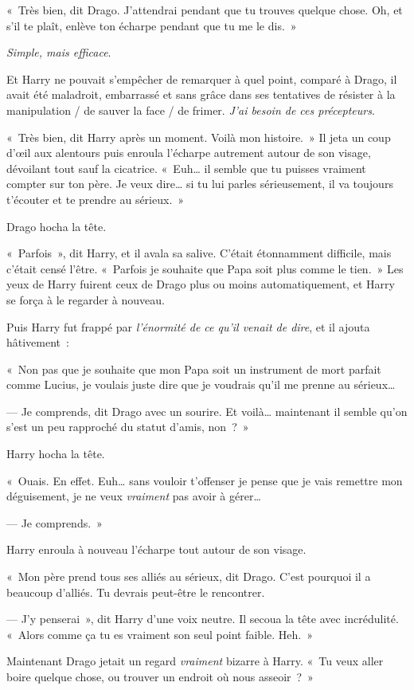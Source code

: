 «~Très bien, dit Drago. J'attendrai pendant que tu trouves quelque chose. Oh, et s'il te plaît, enlève ton écharpe pendant que tu me le dis.~»

\emph{Simple, mais efficace}.

Et Harry ne pouvait s'empêcher de remarquer à quel point, comparé à Drago, il avait été maladroit, embarrassé et sans grâce dans ses tentatives de résister à la manipulation / de sauver la face / de frimer. \emph{J'ai besoin de ces précepteurs}.

«~Très bien, dit Harry après un moment. Voilà mon histoire.~» Il jeta un coup d'œil aux alentours puis enroula l'écharpe autrement autour de son visage, dévoilant tout sauf la cicatrice. «~Euh… il semble que tu puisses vraiment compter sur ton père. Je veux dire… si tu lui parles sérieusement, il va toujours t'écouter et te prendre au sérieux.~»

Drago hocha la tête.

«~Parfois~», dit Harry, et il avala sa salive. C'était étonnamment difficile, mais c'était censé l'être. «~Parfois je souhaite que Papa soit plus comme le tien.~» Les yeux de Harry fuirent ceux de Drago plus ou moins automatiquement, et Harry se força à le regarder à nouveau.

Puis Harry fut frappé par \emph{l'énormité de ce qu'il venait de dire}, et il ajouta hâtivement~:

«~Non pas que je souhaite que mon Papa soit un instrument de mort parfait comme Lucius, je voulais juste dire que je voudrais qu'il me prenne au sérieux…

--- Je comprends, dit Drago avec un sourire. Et voilà… maintenant il semble qu'on s'est un peu rapproché du statut d'amis, non~?~»

Harry hocha la tête.

«~Ouais. En effet. Euh… sans vouloir t'offenser je pense que je vais remettre mon déguisement, je ne veux \emph{vraiment} pas avoir à gérer…

--- Je comprends.~»

Harry enroula à nouveau l'écharpe tout autour de son visage.

«~Mon père prend tous ses alliés au sérieux, dit Drago. C'est pourquoi il a beaucoup d'alliés. Tu devrais peut-être le rencontrer.

--- J'y penserai~», dit Harry d'une voix neutre. Il secoua la tête avec incrédulité. «~Alors comme ça tu es vraiment son seul point faible. Heh.~»

Maintenant Drago jetait un regard \emph{vraiment} bizarre à Harry. «~Tu veux aller boire quelque chose, ou trouver un endroit où nous asseoir~?~»

